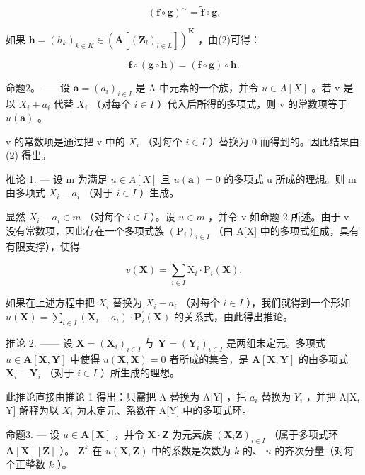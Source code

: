 \[
(\mathbf {f} \circ \mathbf {g}) ^ {\sim} = \tilde {\mathbf {f}} \circ \tilde {\mathbf {g}}.\tag{3}
\]

如果 \(\mathbf{h} = (h_k)_{k\in K}\in (\mathbf{A}[(\mathbf{Z}_l)_{l\in L}])^{\mathbf{K}}\) ，由(2)可得：

\[
\mathbf {f} \circ (\mathbf {g} \circ \mathbf {h}) = (\mathbf {f} \circ \mathbf {g}) \circ \mathbf {h}.\tag{4}
\]

命题2。——设 \(\mathbf{a} = (a_i)_{i \in I}\) 是 A 中元素的一个族，并令 \(u \in A[X]\) 。若 v 是以 \(X_i + a_i\) 代替 \(X_i\) （对每个 \(i \in I\) ）代入后所得的多项式，则 v 的常数项等于 \(u(\mathbf{a})\) 。

v 的常数项是通过把 v 中的 \(X_{i}\) （对每个 \(i \in I\) ）替换为 0 而得到的。因此结果由 (2) 得出。

推论 1. --- 设 m 为满足 \(u \in A[X]\) 且 \(u(\mathbf{a}) = 0\) 的多项式 u 所成的理想。则 m 由多项式 \(X_{i} - a_{i}\) （对于 \(i \in I\) ）生成。

显然 \(X_{i} - a_{i} \in m\) （对每个 \(i \in I\) ）。设 \(u \in m\) ，并令 v 如命题 2 所述。由于 v 没有常数项，因此存在一个多项式族 \((\mathbf{P}_{i})_{i \in I}\) （由 A{[}X{]} 中的多项式组成，具有有限支撑），使得

\[
v (\mathbf {X}) = \sum_ {i \in I} \mathrm{X} _ {i} \cdot \mathrm{P} _ {i} (\mathbf {X}).
\]

如果在上述方程中把 \(X_{i}\) 替换为 \(X_{i}-a_{i}\) （对每个 \(i\in I\) ），我们就得到一个形如 \(u(\mathbf{X})=\sum_{i\in I}\left(\mathbf{X}_{i}-a_{i}\right)\cdot\mathbf{P}_{i}^{\prime}(\mathbf{X})\) 的关系式，由此得出推论。

推论 2. —— 设 \(\mathbf{X} = (\mathbf{X}_i)_{i \in I}\) 与 \(\mathbf{Y} = (\mathbf{Y}_i)_{i \in I}\) 是两组未定元。多项式 \(u \in \mathbf{A}[\mathbf{X}, \mathbf{Y}]\) 中使得 \(u(\mathbf{X}, \mathbf{X}) = 0\) 者所成的集合，是 \(\mathbf{A}[\mathbf{X}, \mathbf{Y}]\) 的由多项式 \(\mathbf{X}_i - \mathbf{Y}_i\) （对于 \(i \in I\) ）所生成的理想。

此推论直接由推论 1 得出：只需把 A 替换为 A{[}Y{]} ，把 \(a_{i}\) 替换为 \(Y_{i}\) ，并把 A{[}X, Y{]} 解释为以 \(X_{i}\) 为未定元、系数在 A{[}Y{]} 中的多项式环。

命题3. --- 设 \(u \in \mathbf{A}[\mathbf{X}]\) ，并令 \(\mathbf{X} \cdot \mathbf{Z}\) 为元素族 \((\mathbf{X}_i\mathbf{Z})_{i \in I}\) （属于多项式环 \(\mathbf{A}[\mathbf{X}][\mathbf{Z}]\) ）。 \(\mathbf{Z}^k\) 在 \(u(\mathbf{X}, \mathbf{Z})\) 中的系数是次数为 \(k\) 的、 \(u\) 的齐次分量（对每个正整数 \(k\) ）。

